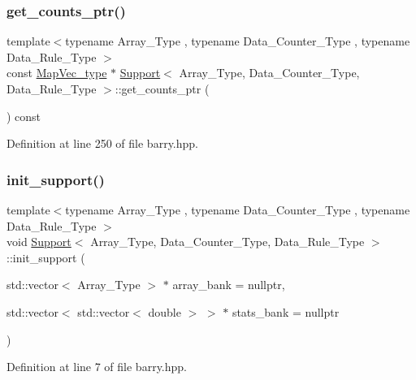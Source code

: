 \subsubsection{\texorpdfstring{get\+\_\+counts\+\_\+ptr()}{get\_counts\_ptr()}}
{\footnotesize\ttfamily template$<$typename Array\+\_\+\+Type , typename Data\+\_\+\+Counter\+\_\+\+Type , typename Data\+\_\+\+Rule\+\_\+\+Type $>$ \\
const \hyperlink{namespacebarry_a2f0d3aab1d67e4c8eaeab9022e16139f}{Map\+Vec\+\_\+type} $\ast$ \hyperlink{classbarry_1_1_support}{Support}$<$ Array\+\_\+\+Type, Data\+\_\+\+Counter\+\_\+\+Type, Data\+\_\+\+Rule\+\_\+\+Type $>$\+::get\+\_\+counts\+\_\+ptr (\begin{DoxyParamCaption}{ }\end{DoxyParamCaption}) const\hspace{0.3cm}{\ttfamily [inline]}}



Definition at line 250 of file barry.\+hpp.

\mbox{\label{classbarry_1_1_support_a013872a55ffd6a0a931e124da8e8dc99}} 
\subsubsection{\texorpdfstring{init\+\_\+support()}{init\_support()}}
{\footnotesize\ttfamily template$<$typename Array\+\_\+\+Type , typename Data\+\_\+\+Counter\+\_\+\+Type , typename Data\+\_\+\+Rule\+\_\+\+Type $>$ \\
void \hyperlink{classbarry_1_1_support}{Support}$<$ Array\+\_\+\+Type, Data\+\_\+\+Counter\+\_\+\+Type, Data\+\_\+\+Rule\+\_\+\+Type $>$\+::init\+\_\+support (\begin{DoxyParamCaption}\item[{std\+::vector$<$ Array\+\_\+\+Type $>$ $\ast$}]{array\+\_\+bank = {\ttfamily nullptr},  }\item[{std\+::vector$<$ std\+::vector$<$ double $>$ $>$ $\ast$}]{stats\+\_\+bank = {\ttfamily nullptr} }\end{DoxyParamCaption})\hspace{0.3cm}{\ttfamily [inline]}}



Definition at line 7 of file barry.\+hpp.

